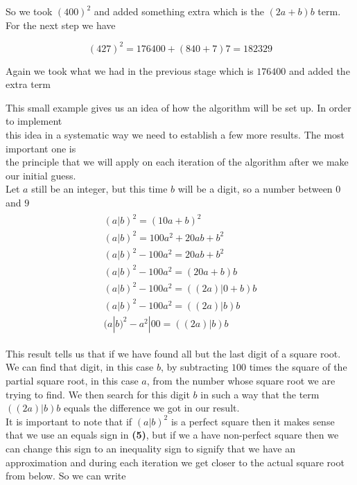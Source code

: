 \documentclass{uofa_template}
\begin{document}
\begin{enumerate}
So we took $(400)^2$ and added something extra which is the $(2a+b)b$ term. For the next
step we have

\begin{equation}
(427)^2 = 176400 + (840 + 7)7 = 182329
\end{equation}

Again we took what we had in the previous stage which is $176400$ and added the extra term

This small example gives us an idea of how the algorithm will be set up. In order to implement \\ this idea in a systematic way we need to establish a few more results. The most important one is \\ 
the principle that we will apply on each iteration of the algorithm after we make our initial guess.\\
Let $a$ still be an integer, but this time $b$ will be a digit, so a number
between $0$ and $9$ \\

\begin{equation}
\begin{gathered}
\begin{aligned}
(a|b)^2 = (10a + b)^2 \\
(a|b)^2 = 100a^2 + 20ab + b^2 \\
(a|b)^2 - 100a^2 = 20ab + b^2 \\
(a|b)^2 - 100a^2 = (20a + b)b \\
(a|b)^2 - 100a^2 = ((2a)|0 + b)b \\
(a|b)^2 - 100a^2 = ((2a)|b)b \\
(a|b)^2 - a^2|00 = ((2a)|b)b
\end{aligned}
\end{gathered}
\end{equation}

This result tells us that if we have found all but the last digit of a square root. We can find
that digit, in this case $b$, by subtracting $100$ times the square of the partial square root, in this case $a$,
from the number whose square root we are trying to find. We then search for this digit $b$
in such a way that the term $((2a)|b)b$ equals the difference we got in our result. \\

It is important to note that if $(a|b)^2$ is a perfect square then it makes sense that we use an equals sign in \textbf{(5)}, but if we a have non-perfect square then we can change this sign to an inequality sign to signify that we have an approximation and during each iteration  we get closer to the actual square root from below. So we can write


\end{enumerate}
\end{document}
